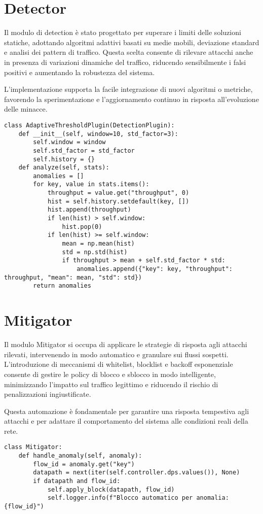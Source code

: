 \section{Detector}
Il modulo di detection è stato progettato per superare i limiti delle soluzioni statiche, adottando algoritmi adattivi basati su medie mobili, deviazione standard e analisi dei pattern di traffico. Questa scelta consente di rilevare attacchi anche in presenza di variazioni dinamiche del traffico, riducendo sensibilmente i falsi positivi e aumentando la robustezza del sistema.\par
L’implementazione supporta la facile integrazione di nuovi algoritmi o metriche, favorendo la sperimentazione e l’aggiornamento continuo in risposta all’evoluzione delle minacce.
\begin{verbatim}
class AdaptiveThresholdPlugin(DetectionPlugin):
    def __init__(self, window=10, std_factor=3):
        self.window = window
        self.std_factor = std_factor
        self.history = {}
    def analyze(self, stats):
        anomalies = []
        for key, value in stats.items():
            throughput = value.get("throughput", 0)
            hist = self.history.setdefault(key, [])
            hist.append(throughput)
            if len(hist) > self.window:
                hist.pop(0)
            if len(hist) >= self.window:
                mean = np.mean(hist)
                std = np.std(hist)
                if throughput > mean + self.std_factor * std:
                    anomalies.append({"key": key, "throughput": throughput, "mean": mean, "std": std})
        return anomalies
\end{verbatim}

\section{Mitigator}
Il modulo Mitigator si occupa di applicare le strategie di risposta agli attacchi rilevati, intervenendo in modo automatico e granulare sui flussi sospetti. L’introduzione di meccanismi di whitelist, blocklist e backoff esponenziale consente di gestire le policy di blocco e sblocco in modo intelligente, minimizzando l’impatto sul traffico legittimo e riducendo il rischio di penalizzazioni ingiustificate.\par
Questa automazione è fondamentale per garantire una risposta tempestiva agli attacchi e per adattare il comportamento del sistema alle condizioni reali della rete.
\begin{verbatim}
class Mitigator:
    def handle_anomaly(self, anomaly):
        flow_id = anomaly.get("key")
        datapath = next(iter(self.controller.dps.values()), None)
        if datapath and flow_id:
            self.apply_block(datapath, flow_id)
            self.logger.info(f"Blocco automatico per anomalia: {flow_id}")
\end{verbatim}

